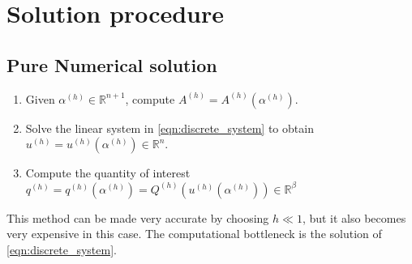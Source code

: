 \documentclass[11pt]{article}
\begin{document}
\section{Solution procedure}
\subsection{Pure Numerical solution}
\begin{enumerate}
\item Given $\alpha^{(h)}\in\mathbb{R}^{n+1}$, compute $A^{(h)}=A^{(h)}(\alpha^{(h)})$.
\item Solve the linear system in \eqref{eqn:discrete_system} to obtain $u^{(h)}=u^{(h)}(\alpha^{(h)})\in\mathbb{R}^n$.
\item Compute the quantity of interest $q^{(h)} = q^{(h)}(\alpha^{(h)})= Q^{(h)}(u^{(h)}(\alpha^{(h)}))\in\mathbb{R}^\beta$
\end{enumerate}
This method can be made very accurate by choosing $h\ll1$, but it also becomes very expensive in this case. The computational bottleneck is the solution of  \eqref{eqn:discrete_system}.
\end{document}
